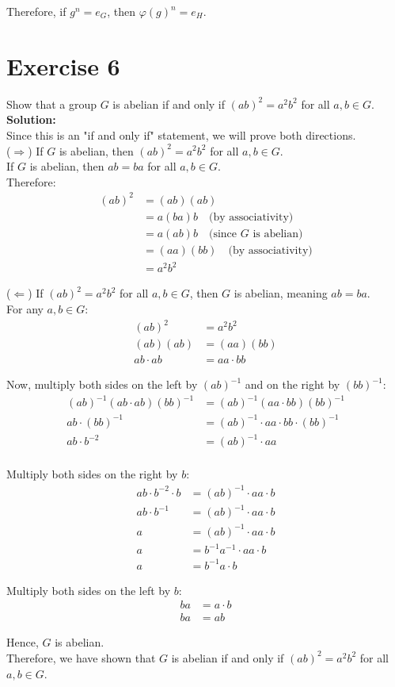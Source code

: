 \documentclass{article}
\begin{document}
Therefore, if $g^n = e_G$, then $\varphi(g)^n = e_H$.
\newpage

\section*{Exercise 6}
Show that a group $G$ is abelian if and only if $(ab)^2 = a^2b^2$ for all $a,b \in G$. \\

\textbf{Solution:} \\

Since this is an "if and only if" statement, we will prove both directions. \\

($\Rightarrow$) If $G$ is abelian, then $(ab)^2 = a^2b^2$ for all $a,b \in G$. \\

If $G$ is abelian, then $ab = ba$ for all $a,b \in G$. \\

Therefore:
\begin{align*}
(ab)^2 &= (ab)(ab) \\
&= a(ba)b \quad \text{(by associativity)} \\
&= a(ab)b \quad \text{(since $G$ is abelian)} \\
&= (aa)(bb) \quad \text{(by associativity)} \\
&= a^2b^2
\end{align*}

($\Leftarrow$) If $(ab)^2 = a^2b^2$ for all $a,b \in G$, then $G$ is abelian, meaning $ab = ba$. \\

For any $a,b \in G$:
\begin{align*}
(ab)^2 &= a^2b^2 \\
(ab)(ab) &= (aa)(bb) \\
ab \cdot ab &= aa \cdot bb
\end{align*}

Now, multiply both sides on the left by $(ab)^{-1}$ and on the right by $(bb)^{-1}$:
\begin{align*}
(ab)^{-1}(ab \cdot ab)(bb)^{-1} &= (ab)^{-1}(aa \cdot bb)(bb)^{-1} \\
ab \cdot (bb)^{-1} &= (ab)^{-1} \cdot aa \cdot bb \cdot (bb)^{-1} \\
ab \cdot b^{-2} &= (ab)^{-1} \cdot aa \\
\end{align*}

Multiply both sides on the right by $b$:
\begin{align*}
ab \cdot b^{-2} \cdot b &= (ab)^{-1} \cdot aa \cdot b \\
ab \cdot b^{-1} &= (ab)^{-1} \cdot aa \cdot b \\
a &= (ab)^{-1} \cdot aa \cdot b \\
a &= b^{-1}a^{-1} \cdot aa \cdot b \\
a &= b^{-1}a \cdot b
\end{align*}

Multiply both sides on the left by $b$:
\begin{align*}
ba &= a \cdot b \\
ba &= ab
\end{align*}

Hence, $G$ is abelian. \\

Therefore, we have shown that $G$ is abelian if and only if $(ab)^2 = a^2b^2$ for all $a,b \in G$.
\end{document}
